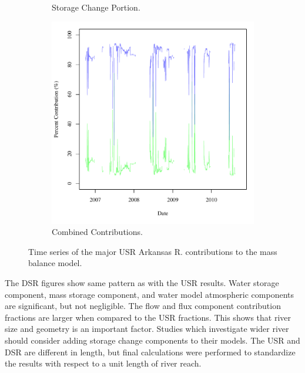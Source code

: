 \begin{linenumbers}
\begin{figure}[htbp]
\begin{subfigure}{0.5\textwidth}
		\caption{Storage Change Portion.}
		\label{sub:DSRMStore}
	\end{subfigure}
	\begin{subfigure}{0.5\textwidth}
		\centering
		\includegraphics[width=0.9\linewidth]{"Figures/Results_DSR/M Mass Contrib 3"}
		\caption{Combined Contributions.}
		\label{sub:DSRMComb}
	\end{subfigure}
	\caption[Time series of the major USR Arkansas R. contributions to the mass balance model.]{Time series of the major USR Arkansas R. contributions to the mass balance model.}
	\label{fig:DSRMassContrib}
\end{figure}

The DSR figures show same pattern as with the USR results.  Water storage component, mass storage component, and water model atmospheric components are significant, but not negligible.  The flow and flux component contribution fractions are larger when compared to the USR fractions.  This shows that river size and geometry is an important factor.  Studies which investigate wider river should consider adding storage change components to their models.  The USR and DSR are different in length, but final calculations were performed to standardize the results with respect to a unit length of river reach.


\end{linenumbers}
